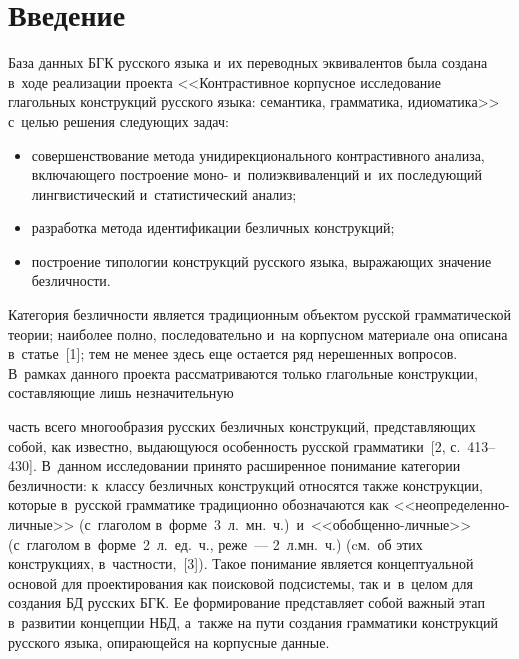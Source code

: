 

\vspace*{-6pt} 



\thispagestyle{headings}

\begin{multicols}{2}

\label{st\stat}
  
\section{Введение}

  База данных БГК русского языка и~их 
переводных эквивалентов была создана в~ходе реализации проекта 
<<Контрастивное корпусное исследование глагольных конструкций русского 
языка: семантика, грамматика, идиоматика>> с~целью решения следующих 
задач:
  \begin{itemize}
\item совершенствование метода унидирекционального контрастивного 
анализа, включающего построение моно- и~полиэквиваленций и~их 
последующий лингвистический и~статистический анализ; 
\item разработка метода идентификации безличных конструкций; 
\item построение типологии конструкций русского языка, выражающих 
значение безличности.
\end{itemize}

  Категория безличности является традиционным объектом русской 
грамматической теории; наиболее полно, последовательно и~на корпусном 
материале она описана в~статье~[1]; тем не менее здесь еще остается ряд 
нерешенных вопросов. В~рамках данного проекта рассматриваются только 
глагольные конструкции, со\-став\-ля\-ющие лишь незначительную\linebreak\vspace*{-12pt}

\columnbreak

\noindent
 часть всего 
многообразия русских безличных конструкций, пред\-став\-ля\-ющих собой, как 
известно, выдающуюся особенность русской грамматики~[2, с.~413--430]. 
В~данном исследовании принято расширенное понимание категории 
безличности: к~классу безличных конструкций относятся также конструкции, 
которые в~русской грамматике традиционно обозначаются как 
  <<не\-опре\-де\-лен\-но-лич\-ные>> (с~глаголом в~форме~3~л.\ мн.~ч.)\ 
и~<<обоб\-щен\-но-лич\-ные>> (с~глаголом в~форме~2~л.\ ед.~ч., реже~--- 
2~л.\linebreak мн.~ч.) (cм.\ об этих конструкциях, в~частности,~[3]). Такое 
понимание является концептуальной основой для проектирования как 
поисковой подсистемы, так и~в~целом для создания БД русских 
БГК. Ее формирование представляет собой 
важный этап в~развитии концепции НБД, а~также на пути 
создания грамматики конструкций русского языка, опирающейся на корпусные 
данные. 
  

\end{multicols}

